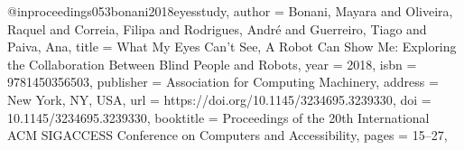 @inproceedings{053bonani2018eyesstudy,
author = {Bonani, Mayara and Oliveira, Raquel and Correia, Filipa and Rodrigues, Andr\'{e} and Guerreiro, Tiago and Paiva, Ana},
title = {What My Eyes Can't See, A Robot Can Show Me: Exploring the Collaboration Between Blind People and Robots},
year = {2018},
isbn = {9781450356503},
publisher = {Association for Computing Machinery},
address = {New York, NY, USA},
url = {https://doi.org/10.1145/3234695.3239330},
doi = {10.1145/3234695.3239330},
booktitle = {Proceedings of the 20th International ACM SIGACCESS Conference on Computers and Accessibility},
pages = {15–27},
}